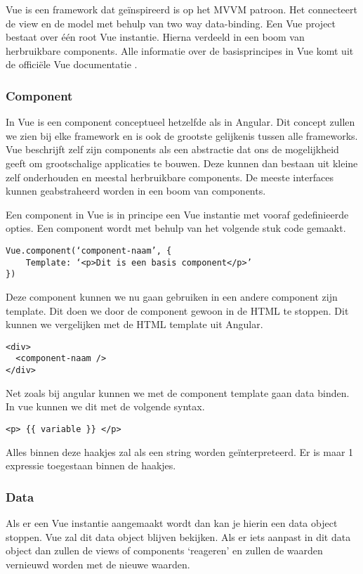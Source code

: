 Vue is een framework dat geïnspireerd is op het MVVM patroon. Het connecteert de view en de model met behulp van two way data-binding. Een Vue project bestaat over één root Vue instantie. Hierna verdeeld in een boom van herbruikbare components.
Alle informatie over de basisprincipes in Vue komt uit de officiële Vue documentatie \autocite{_vue_2018}.

\subsubsection{Component}
\label{sec:Vue_Component}
In Vue is een component conceptueel hetzelfde als in Angular. Dit concept zullen we zien bij elke framework en is ook de grootste gelijkenis tussen alle frameworks. Vue beschrijft zelf zijn components als een abstractie dat ons de mogelijkheid geeft om grootschalige applicaties te bouwen. Deze kunnen dan bestaan uit kleine zelf onderhouden en meestal herbruikbare components. De meeste interfaces kunnen geabstraheerd worden in een boom van components.

Een component in Vue is in principe een Vue instantie met vooraf gedefinieerde opties. Een component wordt met behulp van het volgende stuk code gemaakt.

\begin{verbatim}
Vue.component(‘component-naam’, {
	Template: ‘<p>Dit is een basis component</p>’
})
\end{verbatim}

Deze component kunnen we nu gaan gebruiken in een andere component zijn template. Dit doen we door de component gewoon in de HTML te stoppen. Dit kunnen we vergelijken met de HTML template uit Angular.

\begin{verbatim}
<div>
  <component-naam />
</div>
\end{verbatim}

Net zoals bij angular kunnen we met de component template gaan data binden. In vue kunnen we dit met de volgende syntax.

\begin{verbatim}
<p> {{ variable }} </p>
\end{verbatim}

Alles binnen deze haakjes zal als een string worden geïnterpreteerd. Er is maar 1 expressie toegestaan binnen de haakjes. 

\subsubsection{Data}
\label{sec:Vue_Data}
Als er een Vue instantie aangemaakt wordt dan kan je hierin een data object stoppen. Vue zal dit data object blijven bekijken. Als er iets aanpast in dit data object dan zullen de views of components ‘reageren’ en zullen de waarden vernieuwd worden met de nieuwe waarden.

